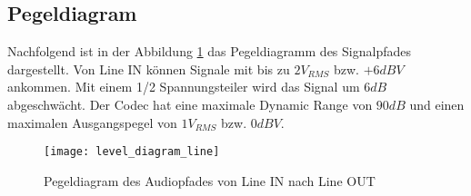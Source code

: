\subsection{Pegeldiagram}
\label{sec:Pegeldiagram}

Nachfolgend ist in der Abbildung \ref{pic:Pegeldiagram_Line} das Pegeldiagramm des Signalpfades dargestellt.
Von Line IN können Signale mit bis zu $2 \si{V_{RMS}}$ bzw. $+6 \si{dBV}$ ankommen. Mit einem 1/2 Spannungsteiler wird das Signal um $6 \si{dB}$ abgeschwächt.
Der Codec hat eine maximale Dynamic Range von $90 \si{dB}$ und einen maximalen Ausgangspegel von $1 \si{V_{RMS}}$ bzw. $0 \si{dBV}$.

\begin{figure}[H]
	\centering
	\texttt{[image: level\_diagram\_line]}
	\caption{Pegeldiagram des Audiopfades von Line IN nach Line OUT}
	\label{pic:Pegeldiagram_Line}
\end{figure}

